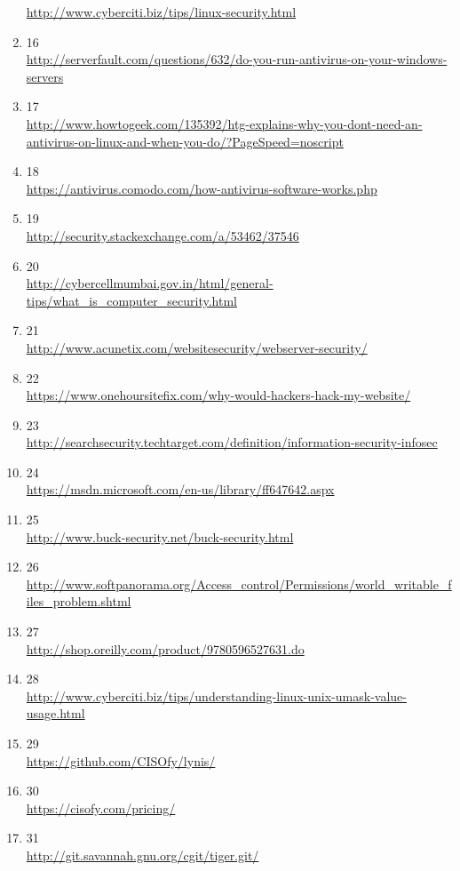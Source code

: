 \documentclass[10pt]{article}
\begin{document}
\begin{sloppypar}
\begin{enumerate}
	\url{http://www.cyberciti.biz/tips/linux-security.html}
\item 16 \\
	\url{http://serverfault.com/questions/632/do-you-run-antivirus-on-your-windows-servers}
\item 17 \\
	\url{http://www.howtogeek.com/135392/htg-explains-why-you-dont-need-an-antivirus-on-linux-and-when-you-do/?PageSpeed=noscript}
\item 18 \\
	\url{https://antivirus.comodo.com/how-antivirus-software-works.php}
\item 19 \\
	\url{http://security.stackexchange.com/a/53462/37546}
\item 20 \\
	\url{http://cybercellmumbai.gov.in/html/general-tips/what\_is\_computer\_security.html}
\item 21 \\
	\url{http://www.acunetix.com/websitesecurity/webserver-security/}
\item 22 \\
	\url{https://www.onehoursitefix.com/why-would-hackers-hack-my-website/}
\item 23 \\
	\url{http://searchsecurity.techtarget.com/definition/information-security-infosec}
\item 24 \\
	\url{https://msdn.microsoft.com/en-us/library/ff647642.aspx}
\item 25 \\
	\url{http://www.buck-security.net/buck-security.html}
\item 26 \\
	\url{http://www.softpanorama.org/Access\_control/Permissions/world\_writable\_files\_problem.shtml}
\item 27 \\
	\url{http://shop.oreilly.com/product/9780596527631.do}
\item 28 \\
	\url{http://www.cyberciti.biz/tips/understanding-linux-unix-umask-value-usage.html}
\item 29 \\
	\url{https://github.com/CISOfy/lynis/}
\item 30 \\
	\url{https://cisofy.com/pricing/}
\item 31 \\
	\url{http://git.savannah.gnu.org/cgit/tiger.git/}
\end{enumerate}



\end{sloppypar}
\end{document}
